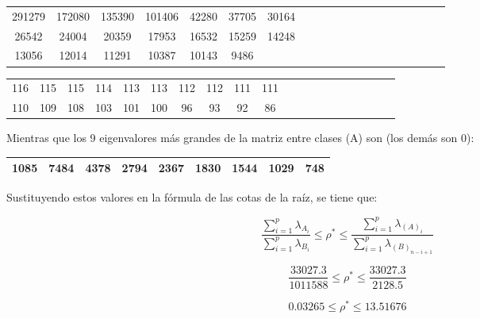 \begin{center}
\begin{tabular}{ | c | c|  c |c | c|  c |c | c|  c |c | c | c|  c |c | c|  c |c | c|  c |c |} 
\hline
291279 & 172080 & 135390 & 101406 & 42280 & 37705 & 30164 \\
26542 & 24004 & 20359 & 17953 & 16532 & 15259 & 14248 \\
13056 & 12014 & 11291 & 10387 & 10143 & 9486 & \\
\hline
\hline
\end{tabular}
\end{center}

\begin{center}
\begin{tabular}{ | c | c|  c |c | c|  c |c | c|  c |c | c | c|  c |c | c|  c |c | c|  c |c |} 
\hline
116 & 115 & 115 & 114 & 113 & 113 & 112 & 112 & 111 & 111 \\
110 & 109 & 108 & 103 & 101 & 100 & 96 & 93 & 92 & 86 \\
\hline
\hline
\end{tabular}
\end{center}

Mientras que los 9 eigenvalores más grandes de la matriz entre clases (A) son (los demás son 0):

\begin{center}
\begin{tabular}{ | c | c|  c |c | c|  c |c | c|  c |} 
\hline
1085 & 7484 & 4378 & 2794 & 2367 & 1830 & 1544 & 1029 & 748 \\
\hline
\hline
\end{tabular}
\end{center}

Sustituyendo estos valores en la fórmula de las cotas de la raíz, se tiene que:

\begin{equation*}
\frac{\sum_{i = 1}^{p}\lambda_{A_i}}{\sum_{i = 1}^{p}\lambda_{B_i}} \leq \rho^* \leq \frac{\sum_{i = 1}^{p}\lambda_{(A)_i}}{\sum_{i = 1}^{p}\lambda_{(B)_{n-i+1}}}	
\end{equation*}

\begin{equation*}
\frac{33027.3}{1011588} \leq \rho^* \leq \frac{33027.3}{2128.5}
\end{equation*}

\begin{equation*}
0.03265 \leq \rho^* \leq 13.51676
\end{equation*}

